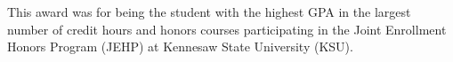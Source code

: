\begin{resume}
\begin{position}
This award was for being the student with the highest GPA in the largest number of credit hours
and honors courses participating in the Joint Enrollment Honors Program (JEHP) at Kennesaw
State University (KSU).
\end{position}



\end{resume}
